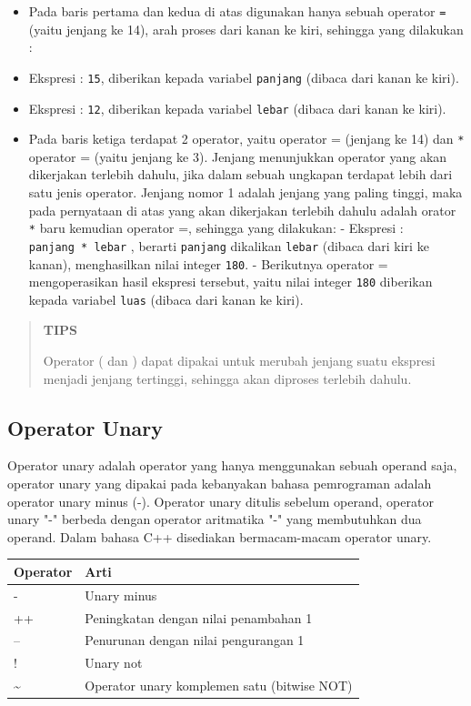 \begin{itemize}
\tightlist
\item
  Pada baris pertama dan kedua di atas digunakan hanya sebuah operator
  \texttt{=} (yaitu jenjang ke 14), arah proses dari kanan ke kiri,
  sehingga yang dilakukan :
\item
  Ekspresi : \texttt{15}, diberikan kepada variabel \texttt{panjang}
  (dibaca dari kanan ke kiri).
\item
  Ekspresi : \texttt{12}, diberikan kepada variabel \texttt{lebar}
  (dibaca dari kanan ke kiri).
\item
  Pada baris ketiga terdapat 2 operator, yaitu operator =  (jenjang
  ke 14) dan \texttt{*} operator = (yaitu jenjang ke 3).
  Jenjang menunjukkan operator yang akan dikerjakan terlebih dahulu,
  jika dalam sebuah ungkapan terdapat lebih dari satu jenis operator.
  Jenjang nomor 1 adalah jenjang yang paling tinggi, maka pada
  pernyataan di atas yang akan dikerjakan terlebih dahulu adalah orator
  \texttt{*} baru kemudian operator =, sehingga yang dilakukan:
  - Ekspresi : \texttt{panjang\ *\ lebar} , berarti \texttt{panjang}
  dikalikan \texttt{lebar} (dibaca dari kiri ke kanan), menghasilkan
  nilai integer \texttt{180}. - Berikutnya operator = mengoperasikan
  hasil ekspresi tersebut, yaitu nilai integer \texttt{180} diberikan
  kepada variabel \texttt{luas} (dibaca dari kanan ke kiri).
\end{itemize}

\begin{quotation}
	\textbf{TIPS}
	
	Operator
	( dan ) dapat dipakai untuk merubah jenjang suatu ekspresi
	menjadi jenjang tertinggi, sehingga akan diproses terlebih dahulu.
\end{quotation}


\subsection{ Operator Unary}\label{a-operator-unary}

Operator unary adalah operator yang hanya menggunakan sebuah operand
saja, operator unary yang dipakai pada kebanyakan bahasa pemrograman
adalah operator unary minus (-). Operator unary ditulis sebelum operand,
operator unary "-" berbeda dengan operator aritmatika "-" yang
membutuhkan dua operand. Dalam bahasa C++ disediakan bermacam-macam
operator unary.

\begin{longtable}[]{@{}ll@{}}
\toprule
Operator & Arti\tabularnewline
\midrule
\endhead
- & Unary minus\tabularnewline
++ & Peningkatan dengan nilai penambahan 1\tabularnewline
-- & Penurunan dengan nilai pengurangan 1\tabularnewline
! & Unary not\tabularnewline
\textasciitilde{} & Operator unary komplemen satu (bitwise
NOT)\tabularnewline
\bottomrule
\end{longtable}


